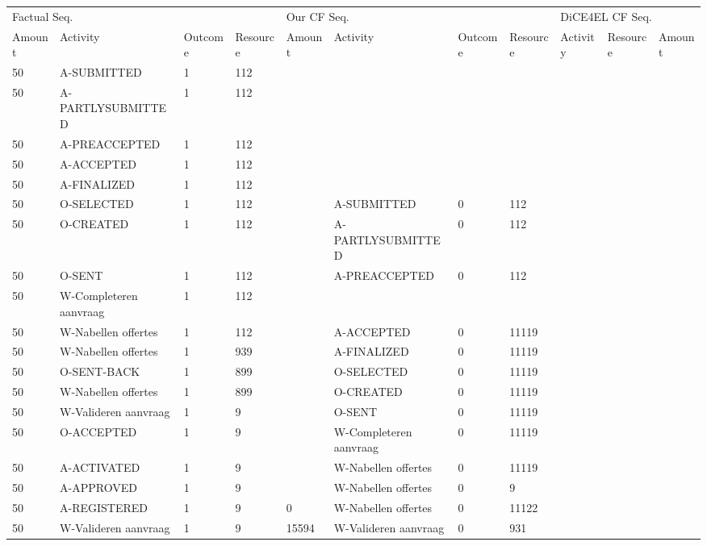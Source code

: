 \begin{tabular}{lllllllllll}
\toprule
\multicolumn{4}{l}{Factual Seq.} & \multicolumn{4}{l}{Our CF Seq.} & \multicolumn{3}{l}{DiCE4EL CF Seq.} \\
Amount & Activity & Outcome & Resource & Amount & Activity & Outcome & Resource & Activity & Resource & Amount \\
\midrule
50 & A-SUBMITTED & 1 & 112 &  &  &  &  &  &  &  \\
50 & A-PARTLYSUBMITTED & 1 & 112 &  &  &  &  &  &  &  \\
50 & A-PREACCEPTED & 1 & 112 &  &  &  &  &  &  &  \\
50 & A-ACCEPTED & 1 & 112 &  &  &  &  &  &  &  \\
50 & A-FINALIZED & 1 & 112 &  &  &  &  &  &  &  \\
50 & O-SELECTED & 1 & 112 &  & A-SUBMITTED & 0 & 112 &  &  &  \\
50 & O-CREATED & 1 & 112 &  & A-PARTLYSUBMITTED & 0 & 112 &  &  &  \\
50 & O-SENT & 1 & 112 &  & A-PREACCEPTED & 0 & 112 &  &  &  \\
50 & W-Completeren aanvraag & 1 & 112 &  &  &  &  &  &  &  \\
50 & W-Nabellen offertes & 1 & 112 &  & A-ACCEPTED & 0 & 11119 &  &  &  \\
50 & W-Nabellen offertes & 1 & 939 &  & A-FINALIZED & 0 & 11119 &  &  &  \\
50 & O-SENT-BACK & 1 & 899 &  & O-SELECTED & 0 & 11119 &  &  &  \\
50 & W-Nabellen offertes & 1 & 899 &  & O-CREATED & 0 & 11119 &  &  &  \\
50 & W-Valideren aanvraag & 1 & 9 &  & O-SENT & 0 & 11119 &  &  &  \\
50 & O-ACCEPTED & 1 & 9 &  & W-Completeren aanvraag & 0 & 11119 &  &  &  \\
50 & A-ACTIVATED & 1 & 9 &  & W-Nabellen offertes & 0 & 11119 &  &  &  \\
50 & A-APPROVED & 1 & 9 &  & W-Nabellen offertes & 0 & 9 &  &  &  \\
50 & A-REGISTERED & 1 & 9 & 0 & W-Nabellen offertes & 0 & 11122 &  &  &  \\
50 & W-Valideren aanvraag & 1 & 9 & 15594 & W-Valideren aanvraag & 0 & 931 &  &  &  \\
\bottomrule
\end{tabular}
